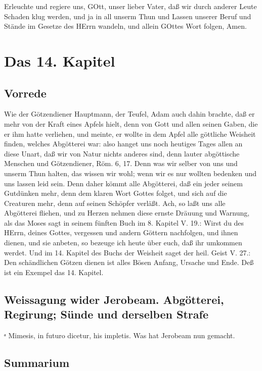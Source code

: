 Erleuchte und regiere uns, GOtt, unser lieber Vater, daß wir durch anderer Leute Schaden klug werden, und ja in all unserm Thun und Lassen unserer Beruf und Stände im Gesetze des HErrn wandeln, und allein GOttes Wort folgen, Amen.

\chapter{Das 14. Kapitel}

\section{Vorrede}

Wie der Götzendiener Hauptmann, der Teufel, Adam auch dahin brachte, daß er mehr von der Kraft eines Apfels hielt, denn von Gott und allen seinen Gaben, die er ihm hatte verliehen, und meinte, er wollte in dem Apfel alle göttliche Weisheit finden, welches Abgötterei war: also hanget uns noch heutiges Tages allen an diese Unart, daß wir von Natur nichts anderes sind, denn lauter abgöttische Menschen und Götzendiener, Röm. 6, 17. Denn was wir selber von uns und unserm Thun halten, das wissen wir wohl; wenn wir es nur wollten bedenken und uns lassen leid sein. Denn daher kömmt alle Abgötterei, daß ein jeder seinem Gutdünken mehr, denn dem klaren Wort Gottes folget, und sich auf die Creaturen mehr, denn auf seinen Schöpfer verläßt. Ach, so laßt uns alle Abgötterei fliehen, und zu Herzen nehmen diese ernste Dräuung und Warnung, als das Moses sagt in seinem fünften Buch im 8. Kapitel V. 19.: Wirst du des HErrn, deines Gottes, vergessen und andern Göttern nachfolgen, und ihnen dienen, und sie anbeten, so bezeuge ich heute über euch, daß ihr umkommen werdet. Und im 14. Kapitel des Buchs der Weisheit saget der heil. Geist V. 27.: Den schändlichen Götzen dienen ist alles Bösen Anfang, Ursache und Ende. Deß ist ein Exempel das 14. Kapitel.

\section[Weissagung wider Jerobeam. Abgötterei, Regirung; Sünde und derselben]{Weissagung wider Jerobeam. Abgötterei, Regirung; Sünde und derselben Strafe}
ᵃ Mimesis, in futuro dicetur, his impletis. Was hat Jerobeam nun gemacht.

\section{Summarium}

